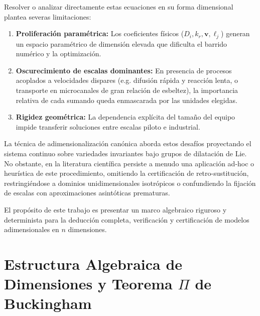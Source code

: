 \documentclass[11pt,a4paper]{article}
\begin{document}
Resolver o analizar directamente estas ecuaciones en su forma dimensional plantea severas limitaciones:
\begin{enumerate}
    \item \textbf{Proliferación paramétrica:} Los coeficientes físicos ($D_i, k_r, \mathbf{v}, \ell_j$) generan un espacio paramétrico de dimensión elevada que dificulta el barrido numérico y la optimización.
    \item \textbf{Oscurecimiento de escalas dominantes:} En presencia de procesos acoplados a velocidades dispares (e.g. difusión rápida y reacción lenta, o transporte en microcanales de gran relación de esbeltez), la importancia relativa de cada sumando queda enmascarada por las unidades elegidas.
    \item \textbf{Rigidez geométrica:} La dependencia explícita del tamaño del equipo impide transferir soluciones entre escalas piloto e industrial.
\end{enumerate}

La técnica de adimensionalización canónica aborda estos desafíos proyectando el sistema continuo sobre variedades invariantes bajo grupos de dilatación de Lie. No obstante, en la literatura científica persiste a menudo una aplicación ad-hoc o heurística de este procedimiento, omitiendo la certificación de retro-sustitución, restringiéndose a dominios unidimensionales isotrópicos o confundiendo la fijación de escalas con aproximaciones asintóticas prematuras. 

El propósito de este trabajo es presentar un marco algebraico riguroso y determinista para la deducción completa, verificación y certificación de modelos adimensionales en $n$ dimensiones.

\section{Estructura Algebraica de Dimensiones y Teorema $\Pi$ de Buckingham}
\end{document}
